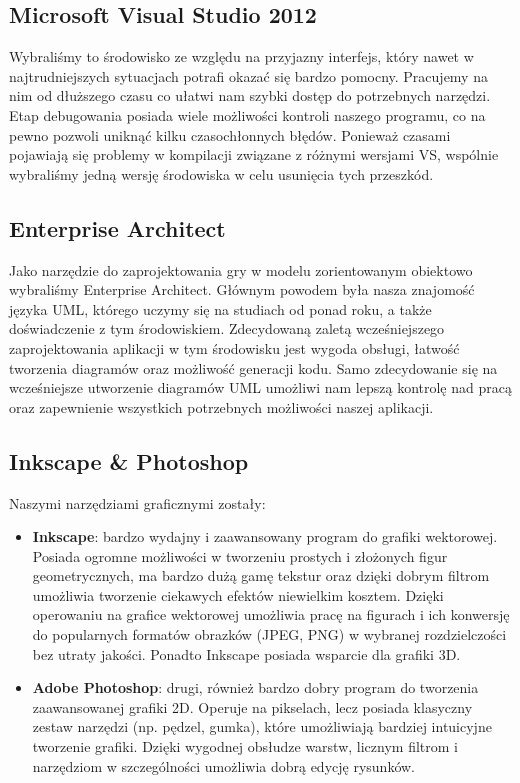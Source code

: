 	\subsection{Microsoft Visual Studio 2012}
		\indent \indent Wybraliśmy to środowisko ze względu na przyjazny interfejs, który nawet w najtrudniejszych sytuacjach potrafi okazać się bardzo pomocny. Pracujemy na nim od dłuższego czasu co ułatwi nam szybki dostęp do potrzebnych narzędzi. Etap debugowania posiada wiele możliwości kontroli naszego programu, co na pewno pozwoli uniknąć kilku czasochłonnych błędów. Ponieważ czasami pojawiają się problemy w kompilacji związane z różnymi wersjami VS, wspólnie wybraliśmy jedną wersję środowiska w celu usunięcia tych przeszkód.
	
	\newpage
	\subsection{Enterprise Architect}
		\indent \indent Jako narzędzie do zaprojektowania gry w modelu zorientowanym obiektowo wybraliśmy Enterprise Architect. Głównym powodem była nasza znajomość języka UML, którego uczymy się na studiach od ponad roku, a także doświadczenie z tym środowiskiem. Zdecydowaną zaletą wcześniejszego zaprojektowania aplikacji w tym środowisku jest wygoda obsługi, łatwość tworzenia diagramów oraz możliwość generacji kodu. Samo zdecydowanie się na wcześniejsze utworzenie diagramów UML umożliwi nam lepszą kontrolę nad pracą oraz zapewnienie wszystkich potrzebnych możliwości naszej aplikacji.
	
	\subsection{Inkscape \& Photoshop}
	Naszymi narzędziami graficznymi zostały:
	\begin{itemize}
		\item \textbf{Inkscape}: bardzo wydajny i zaawansowany program do grafiki wektorowej. Posiada ogromne możliwości w tworzeniu prostych i złożonych figur geometrycznych, ma bardzo dużą gamę tekstur oraz dzięki dobrym filtrom umożliwia tworzenie ciekawych efektów niewielkim kosztem. Dzięki operowaniu na grafice wektorowej umożliwia pracę na figurach i ich konwersję do popularnych formatów obrazków (JPEG, PNG) w wybranej rozdzielczości bez utraty jakości. Ponadto Inkscape posiada wsparcie dla grafiki 3D.
		\item \textbf{Adobe Photoshop}: drugi, również bardzo dobry program do tworzenia zaawansowanej grafiki 2D. Operuje na pikselach, lecz posiada klasyczny zestaw narzędzi (np. pędzel, gumka), które umożliwiają bardziej intuicyjne tworzenie grafiki. Dzięki wygodnej obsłudze warstw, licznym filtrom i narzędziom w szczególności umożliwia dobrą edycję rysunków.
	\end{itemize}
	
